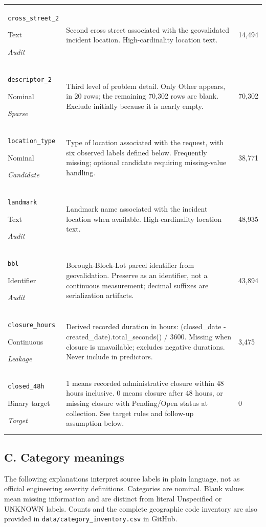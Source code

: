 \begin{longtable}{@{}p{.27\linewidth}p{.60\linewidth}p{.07\linewidth}@{}}
\texttt{cross\_\allowbreak{}street\_\allowbreak{}2}\par Text\par\emph{Audit} & Second cross street associated with the geovalidated incident location. High-cardinality location text. & 14,494\\
\texttt{descriptor\_\allowbreak{}2}\par Nominal\par\emph{Sparse} & Third level of problem detail. Only Other appears, in 20 rows; the remaining 70,302 rows are blank. Exclude initially because it is nearly empty. & 70,302\\
\texttt{location\_\allowbreak{}type}\par Nominal\par\emph{Candidate} & Type of location associated with the request, with six observed labels defined below. Frequently missing; optional candidate requiring missing-value handling. & 38,771\\
\texttt{landmark}\par Text\par\emph{Audit} & Landmark name associated with the incident location when available. High-cardinality location text. & 48,935\\
\texttt{bbl}\par Identifier\par\emph{Audit} & Borough-Block-Lot parcel identifier from geovalidation. Preserve as an identifier, not a continuous measurement; decimal suffixes are serialization artifacts. & 43,894\\
\texttt{closure\_\allowbreak{}hours}\par Continuous\par\emph{Leakage} & Derived recorded duration in hours: (closed\_date - created\_date).total\_seconds() / 3600. Missing when closure is unavailable; excludes negative durations. Never include in predictors. & 3,475\\
\texttt{closed\_\allowbreak{}48h}\par Binary target\par\emph{Target} & 1 means recorded administrative closure within 48 hours inclusive. 0 means closure after 48 hours, or missing closure with Pending/Open status at collection. See target rules and follow-up assumption below. & 0\\
\end{longtable}
\subsection*{C. Category meanings}
The following explanations interpret source labels in plain language, not as official engineering severity definitions. Categories are nominal. Blank values mean missing information and are distinct from literal Unspecified or UNKNOWN labels. Counts and the complete geographic code inventory are also provided in \texttt{data/category\_inventory.csv} in GitHub.
